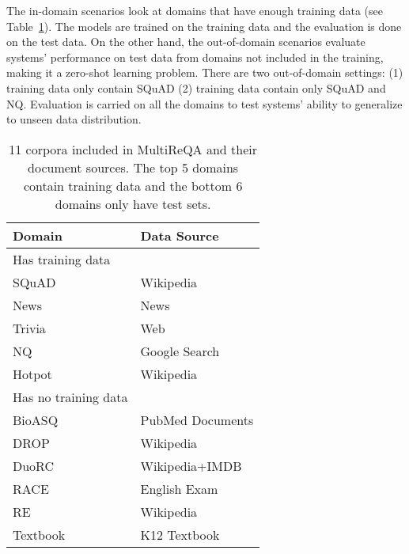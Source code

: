 \documentclass[11pt,a4paper]{article}
\begin{document}
The in-domain scenarios look at domains that have enough training data (see Table~\ref{tbl:reqa_data}). The models are trained on the training data and the evaluation is done on the test data. On the other hand, the out-of-domain scenarios evaluate systems' performance on test data from domains not included in the training, making it a zero-shot learning problem. There are two out-of-domain settings: (1) training data only contain SQuAD (2) training data contain only SQuAD and NQ. Evaluation is carried on all the domains to test systems' ability to generalize to unseen data distribution.

\begin{table}[ht]
\small
\begin{tabular}{p{}p{}} \hline
\textbf{Domain}                        & \textbf{Data Source}  \\ \hline
Has training data & \\ \hline
SQuAD~\cite{rajpurkar2016squad}          & Wikipedia                    \\
News~\cite{trischler2016newsqa}          & News                       \\
Trivia~\cite{joshi2017triviaqa}          & Web                        \\
NQ~\cite{kwiatkowski2019natural}         & Google Search                                           \\
Hotpot~\cite{yang2018hotpotqa}           & Wikipedia                       \\ \hline
Has no training data                    &                              \\ \hline
BioASQ~\cite{tsatsaronis2015overview}    & PubMed Documents                  \\
DROP~\cite{dua2019drop}                  & Wikipedia                       \\
DuoRC~\cite{saha2018duorc}               & Wikipedia+IMDB                       \\
RACE~\cite{lai2017race}                  & English Exam                       \\
RE~\cite{levy2017zero}                   & Wikipedia                       \\
Textbook~\cite{kembhavi2017you}          & K12 Textbook                  \\ \hline
\end{tabular}
\caption{11 corpora included in MultiReQA and their document sources. The top 5 domains contain training data and the bottom 6 domains only have test sets.}
\label{tbl:reqa_data}
\end{table}
\end{document}
